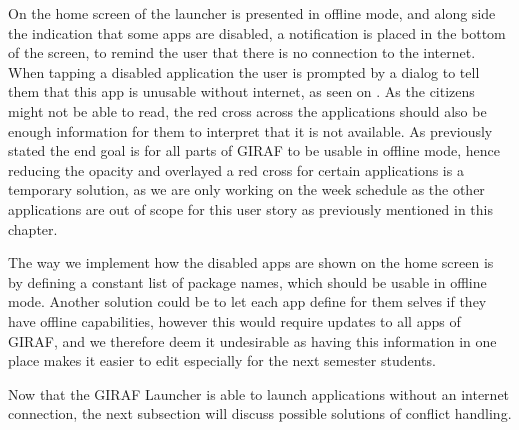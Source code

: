 On  the home screen of the launcher is presented in offline mode, and along side the indication that some apps are disabled, a notification is placed in the bottom of the screen, to remind the user that there is no connection to the internet.
When tapping a disabled application the user is prompted by a dialog to tell them that this app is unusable without internet, as seen on . 
As the citizens might not be able to read, the red cross across the applications should also be enough information for them to interpret that it is not available.
As previously stated the end goal is for all parts of GIRAF to be usable in offline mode, hence reducing the opacity and overlayed a red cross for certain applications is a temporary solution, as we are only working on the week schedule as the other applications are out of scope for this user story as previously mentioned in this chapter.

The way we implement how the disabled apps are shown on the home screen is by defining a constant list of package names, which should be usable in offline mode.
Another solution could be to let each app define for them selves if they have offline capabilities, however this would require updates to all apps of GIRAF, and we therefore deem it undesirable as having this information in one place makes it easier to edit especially for the next semester students.

Now that the GIRAF Launcher is able to launch applications without an internet connection, the next subsection will discuss possible solutions of conflict handling.

